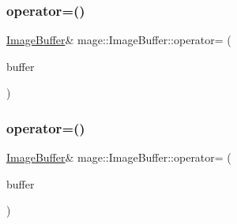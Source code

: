 \hypertarget{structmage_1_1_image_buffer_a4d89827bca3d3f2e748536b6b6a40470}{}\label{structmage_1_1_image_buffer_a4d89827bca3d3f2e748536b6b6a40470} 
\subsubsection{\texorpdfstring{operator=()}{operator=()}\hspace{0.1cm}{\footnotesize\ttfamily [1/2]}}
{\footnotesize\ttfamily \hyperlink{structmage_1_1_image_buffer}{Image\+Buffer}\& mage\+::\+Image\+Buffer\+::operator= (\begin{DoxyParamCaption}\item[{const \hyperlink{structmage_1_1_image_buffer}{Image\+Buffer} \&}]{buffer }\end{DoxyParamCaption})\hspace{0.3cm}{\ttfamily [delete]}}

\hypertarget{structmage_1_1_image_buffer_aa82afa518fa42edea4ada42b9adb92df}{}\label{structmage_1_1_image_buffer_aa82afa518fa42edea4ada42b9adb92df} 
\subsubsection{\texorpdfstring{operator=()}{operator=()}\hspace{0.1cm}{\footnotesize\ttfamily [2/2]}}
{\footnotesize\ttfamily \hyperlink{structmage_1_1_image_buffer}{Image\+Buffer}\& mage\+::\+Image\+Buffer\+::operator= (\begin{DoxyParamCaption}\item[{\hyperlink{structmage_1_1_image_buffer}{Image\+Buffer} \&\&}]{buffer }\end{DoxyParamCaption})\hspace{0.3cm}{\ttfamily [delete]}}

\hypertarget{structmage_1_1_image_buffer_a9f9da805ed9a5d304b5885ed8f1c862c}{}\label{structmage_1_1_image_buffer_a9f9da805ed9a5d304b5885ed8f1c862c} 
